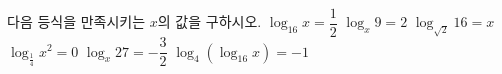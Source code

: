 다음 등식을 만족시키는 $x$의 값을 구하시오.
 $\log_{16} x=\dfrac{1}{2}$
 $\log_x 9=2$
 $\log_{\sqrt{2}} 16=x$
 $\log_{\frac{1}{4}} x^2=0$
 $\log_x 27=-\dfrac{3}{2}$
 $\log_4 (\log_{16} x)=-1$
